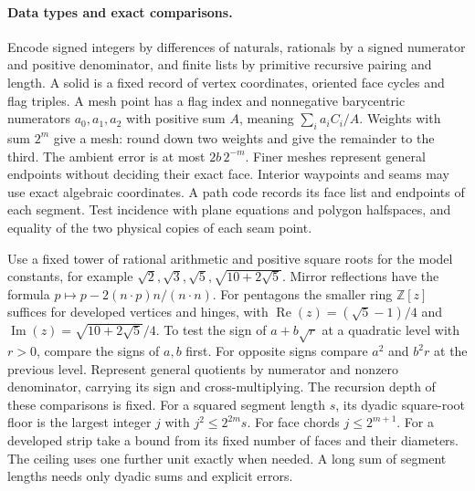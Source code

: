 \paragraph{Data types and exact comparisons.}
Encode signed integers by differences of naturals, rationals by a signed numerator and positive denominator, and finite lists by primitive recursive pairing and length. A solid is a fixed record of vertex coordinates, oriented face cycles and flag triples. A mesh point has a flag index and nonnegative barycentric numerators $a_0,a_1,a_2$ with positive sum $A$, meaning $\sum_i a_i C_i/A$. Weights with sum $2^m$ give a mesh: round down two weights and give the remainder to the third. The ambient error is at most $2b\,2^{-m}$. Finer meshes represent general endpoints without deciding their exact face. Interior waypoints and seams may use exact algebraic coordinates. A path code records its face list and endpoints of each segment. Test incidence with plane equations and polygon halfspaces, and equality of the two physical copies of each seam point.

Use a fixed tower of rational arithmetic and positive square roots for the model constants, for example $\sqrt2,\sqrt3,\sqrt5,\sqrt{10+2\sqrt5}$. Mirror reflections have the formula $p\mapsto p-2(n\cdot p)n/(n\cdot n)$. For pentagons the smaller ring $\mathbb Z[z]$ suffices for developed vertices and hinges, with $\operatorname{Re}(z)=(\sqrt5-1)/4$ and $\operatorname{Im}(z)=\sqrt{10+2\sqrt5}/4$. To test the sign of $a+b\sqrt r$ at a quadratic level with $r>0$, compare the signs of $a,b$ first. For opposite signs compare $a^2$ and $b^2r$ at the previous level. Represent general quotients by numerator and nonzero denominator, carrying its sign and cross-multiplying. The recursion depth of these comparisons is fixed. For a squared segment length $s$, its dyadic square-root floor is the largest integer $j$ with $j^2\le2^{2m}s$. For face chords $j\le2^{m+1}$. For a developed strip take a bound from its fixed number of faces and their diameters. The ceiling uses one further unit exactly when needed. A long sum of segment lengths needs only dyadic sums and explicit errors.

